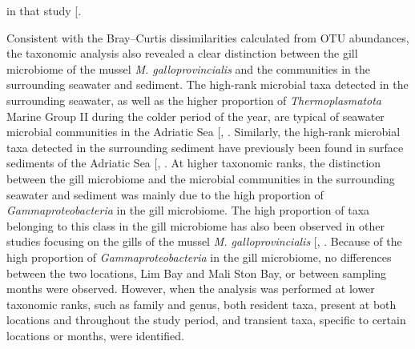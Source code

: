 \documentclass[
  12 pt,
]{article}
\begin{document}
in that study {[}\citeproc{ref-Zardinoni2024}{31}{]}.

Consistent with the Bray--Curtis dissimilarities calculated from OTU abundances, the taxonomic analysis also revealed a clear distinction between the gill microbiome of the mussel \emph{M. galloprovincialis} and the communities in the surrounding seawater and sediment. The high-rank microbial taxa detected in the surrounding seawater, as well as the higher proportion of \emph{Thermoplasmatota} Marine Group II during the colder period of the year, are typical of seawater microbial communities in the Adriatic Sea {[}, \citeproc{ref-Korlevic2022}{91}{]}. Similarly, the high-rank microbial taxa detected in the surrounding sediment have previously been found in surface sediments of the Adriatic Sea {[}, \citeproc{ref-Ramljak2024}{92}{]}. At higher taxonomic ranks, the distinction between the gill microbiome and the microbial communities in the surrounding seawater and sediment was mainly due to the high proportion of \emph{Gammaproteobacteria} in the gill microbiome. The high proportion of taxa belonging to this class in the gill microbiome has also been observed in other studies focusing on the gills of the mussel \emph{M. galloprovincialis} {[}, \citeproc{ref-Zardinoni2024}{31}{]}. Because of the high proportion of \emph{Gammaproteobacteria} in the gill microbiome, no differences between the two locations, Lim Bay and Mali Ston Bay, or between sampling months were observed. However, when the analysis was performed at lower taxonomic ranks, such as family and genus, both resident taxa, present at both locations and throughout the study period, and transient taxa, specific to certain locations or months, were identified.
\end{document}
